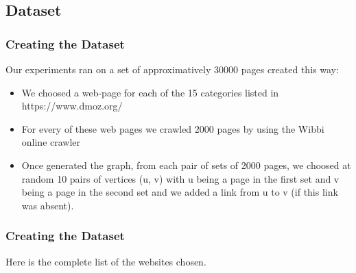 \documentclass{beamer}
\begin{document}
\subsection{Dataset}
\begin{frame}
\frametitle{Creating the Dataset}
Our experiments ran on a set of approximatively 30000 pages created this way:
\begin{itemize}
\item We choosed a web-page for each of the 15 categories listed in https://www.dmoz.org/
\item For every of these web pages we crawled 2000 pages by using the Wibbi online crawler
\item Once generated the graph, from each pair of sets of 2000 pages, we choosed at random 10 pairs of vertices (u, v) with u being a page in the first set and v being a page in the second set and we added a link from u to v (if this link was absent).
\end{itemize}
\end{frame}

\begin{frame}
\frametitle{Creating the Dataset}
Here is the complete list of the websites chosen.
\begin{table}[]
	\centering
\end{table}
\end{frame}
\end{document}
